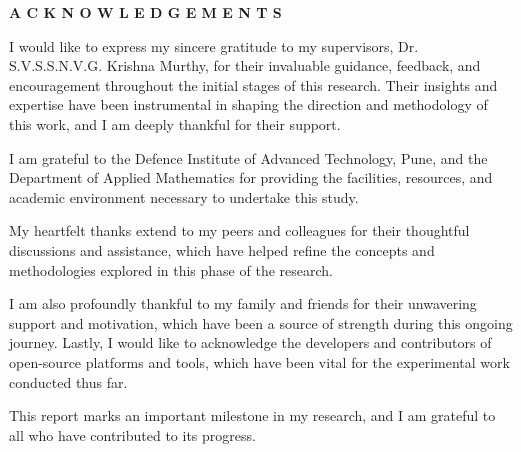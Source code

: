 \begin{center}
{\bf A C K N O W L E D G E M E N T S}
\end{center}
\vspace{0.8cm}
I would like to express my sincere gratitude to my supervisors, Dr. S.V.S.S.N.V.G.
Krishna Murthy, for their invaluable guidance, feedback, and
encouragement throughout the initial stages of this research. Their insights and expertise have been instrumental in shaping the direction and methodology of this work, and I am deeply thankful for their support.

I am grateful to the Defence Institute of Advanced Technology, Pune, and the Department of Applied Mathematics for providing the facilities, resources, and academic
environment necessary to undertake this study.

My heartfelt thanks extend to my peers and colleagues for their thoughtful discussions
and assistance, which have helped refine the concepts and methodologies explored in this phase of the research.

I am also profoundly thankful to my family and friends for their unwavering support and
motivation, which have been a source of strength during this ongoing journey.
Lastly, I would like to acknowledge the developers and contributors of open-source platforms and tools, which have been vital for the experimental work conducted thus far.

This report marks an important milestone in my research, and I am grateful to all who
have contributed to its progress.